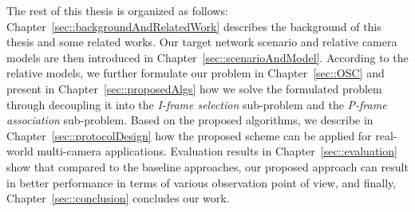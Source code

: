 The rest of this thesis is organized as follows:
Chapter~\ref{sec::backgroundAndRelatedWork} describes the background of this thesis and some related works.
Our target network scenario and relative camera models are then introduced in Chapter~\ref{sec::scenarioAndModel}.
According to the relative models, we further formulate our problem in Chapter~\ref{sec::OSC} and present in Chapter~\ref{sec::proposedAlgs} how we solve the formulated problem through decoupling it into the {\em I-frame selection} sub-problem and the {\em P-frame association} sub-problem. 
Based on the proposed algorithms, we describe in Chapter~\ref{sec::protocolDesign} how the proposed scheme can be applied for real-world multi-camera applications.
Evaluation results in Chapter~\ref{sec::evaluation} show that compared to the baseline approaches, our proposed approach can result in better performance in terms of various observation point of view, and finally, Chapter~\ref{sec::conclusion} concludes our work.